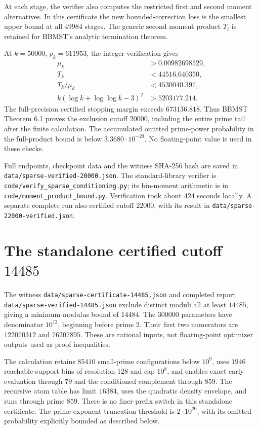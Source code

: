 \documentclass[11pt]{article}
\begin{document}
At each stage, the verifier also computes the restricted first and second
moment alternatives. In this certificate the new bounded-correction loss
is the smallest upper bound at all $49984$ stages. The generic second
moment product $T_i$ is retained for BBMST's analytic termination theorem.

At $k=50000$, $p_k=611953$, the integer verification gives
\begin{align*}
 \mu_k&>0.00982698529,\\
 T_k&<44516.640350,\\
 T_k/\mu_k&<4530040.397,\\
 k(\log k+\log\log k-3)^2&>5203177.214.
\end{align*}
The full-precision certified stopping margin exceeds $673136.818$.
Thus BBMST Theorem 6.1 proves the exclusion cutoff $20000$, including the entire
prime tail after the finite calculation. The accumulated omitted
prime-power probability in the full-product bound is below
$3.3680\cdot10^{-29}$. No floating-point value is used in these checks.

Full endpoints, checkpoint data and the witness SHA-256 hash are saved in
\texttt{data/sparse-verified-20000.json}. The standard-library verifier
is \texttt{code/verify\_sparse\_conditioning.py}; its bin-moment arithmetic
is in \texttt{code/moment\_product\_bound.py}. Verification took about
$424$ seconds locally. A separate complete run also certified cutoff
$22000$, with its result in \texttt{data/sparse-22000-verified.json}.

\section{The standalone certified cutoff $14485$}\label{sec:14485}
The witness \texttt{data/sparse-certificate-14485.json} and completed
report \texttt{data/sparse-verified-14485.json} exclude distinct moduli
all at least $14485$, giving a minimum-modulus bound of $14484$.
The $300000$ parameters have denominator $10^{12}$, beginning before
prime $2$. Their first two numerators are $122070312$ and $76207895$.
These are rational inputs, not floating-point optimizer outputs used
as proof inequalities.

The calculation retains $85410$ small-prime configurations below $10^9$,
uses $1946$ reachable-support bins of resolution $128$ and cap $10^8$,
and enables exact early evaluation through $79$ and the conditioned
complement through $859$. The recursive atom table has limit $16384$,
uses the quadratic density envelope, and runs through prime $859$.
There is no finer-prefix switch in this standalone certificate.
The prime-exponent truncation threshold is $2\cdot10^{20}$, with its
omitted probability explicitly bounded as described below.
\end{document}
